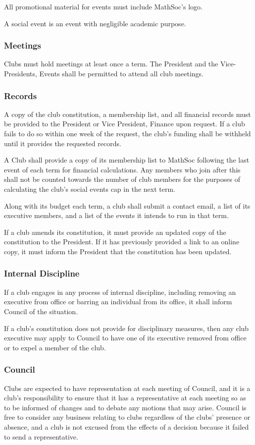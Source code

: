 All promotional material for events must include MathSoc's logo.

A social event is an event with negligible academic purpose.

\subsubsection{Meetings}
Clubs must hold meetings at least once a term. The President and the Vice-
Presidents, Events shall be permitted to attend all club meetings.

\subsubsection{Records}
A copy of the club constitution, a membership list, and all financial records
must be provided to the President or Vice President, Finance
upon request. If a club fails to do so within one week of the request, the
club's funding shall be withheld until it provides the requested records.

A Club shall provide a copy of its membership list to MathSoc following the
last event of each term for financial calculations. Any members who join after
this shall not be counted towards the number of club members for the purposes
of calculating the club's social events cap in the next term.

Along with its budget each term, a club shall submit a contact email, a list of
its executive members, and a list of the events it intends to run in that term.

If a club amends its constitution, it must provide an updated copy of the
constitution to the President. If it has previously provided a
link to an online copy, it must inform the President that the
constitution has been updated.

\subsubsection{Internal Discipline}
If a club engages in any process of internal discipline, including removing an
executive from office or barring an individual from its office, it shall inform
Council of the situation.

If a club's constitution does not provide for disciplinary measures, then any
club executive may apply to Council to have one of its executive removed from
office or to expel a member of the club.

\subsubsection{Council}
Clubs are expected to have representation at each meeting of Council, and it is
a club's responsibility to ensure that it has a representative at each meeting
so as to be informed of changes and to debate any motions that may arise.
Council is free to consider any business relating to clubs regardless of the
clubs' presence or absence, and a club is not excused from the effects of a
decision because it failed to send a representative.

